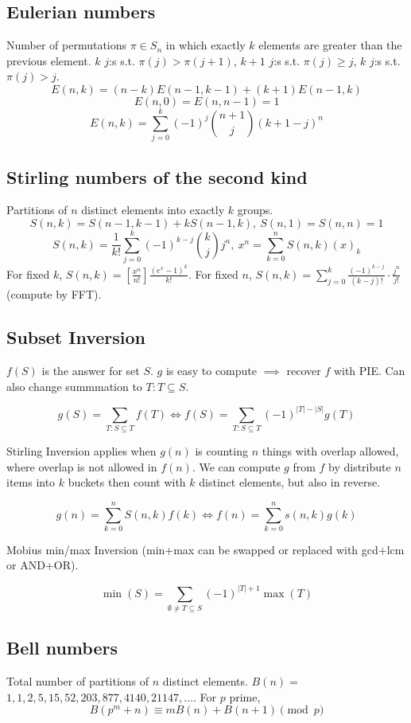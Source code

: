 	\subsection{Eulerian numbers}
		Number of permutations $\pi \in S_n$ in which exactly $k$ elements are greater than the previous element. $k$ $j$:s s.t. $\pi(j)>\pi(j+1)$, $k+1$ $j$:s s.t. $\pi(j)\geq j$, $k$ $j$:s s.t. $\pi(j)>j$.
		$$E(n,k) = (n-k)E(n-1,k-1) + (k+1)E(n-1,k)$$
		$$E(n,0) = E(n,n-1) = 1$$
		$$E(n,k) = \sum_{j=0}^k(-1)^j\binom{n+1}{j}(k+1-j)^n$$

	\subsection{Stirling numbers of the second kind}
		Partitions of $n$ distinct elements into exactly $k$ groups.
		$$S(n,k) = S(n-1,k-1) + k S(n-1,k),\ S(n,1) = S(n,n) = 1$$
		$$S(n,k) = \frac{1}{k!}\sum_{j=0}^k (-1)^{k-j}\binom{k}{j}j^n,\ x^n = \sum_{k=0}^n S(n,k)(x)_k $$
		For fixed $k$, $S(n,k) = [\frac{x^n}{n!}]\frac{(e^x-1)^k}{k!}$.
		For fixed $n$, $S(n,k)=\sum_{j=0}^k \frac{(-1)^{k-j}}{(k-j)!} \cdot \frac{j^n}{j!}$ (compute by FFT).

\columnbreak
	
	\subsection{Subset Inversion}
		$f(S)$ is the answer for set $S$. $g$ is easy to compute $\implies$ recover $f$ with PIE. 
		Can also change summmation to $T:T\subseteq S$.

		$$g(S)=\sum_{T:S\subseteq T}f(T) \iff f(S)=\sum_{T:S\subseteq T}(-1)^{|T|-|S|}g(T)$$

		Stirling Inversion applies when $g(n)$ is counting $n$ things with overlap allowed, where overlap is not allowed in $f(n)$. 
		We can compute $g$ from $f$ by distribute $n$ items into $k$ buckets then count with $k$ distinct elements, 
		but also in reverse.

		$$g(n)=\sum_{k=0}^nS(n,k)f(k) \iff f(n)=\sum_{k=0}^n s(n,k)g(k)$$

		Mobius min/max Inversion (min+max can be swapped or replaced with gcd+lcm or AND+OR).

		$$\min(S) = \sum_{\emptyset \neq T \subseteq S}(-1)^{|T|+1}\max(T)$$

	\subsection{Bell numbers}
		Total number of partitions of $n$ distinct elements. $B(n) =$
		$1, 1, 2, 5, 15, 52, 203, 877, 4140, 21147, \dots$. For $p$ prime,
		\[ B(p^m+n)\equiv mB(n)+B(n+1) \pmod{p} \]

